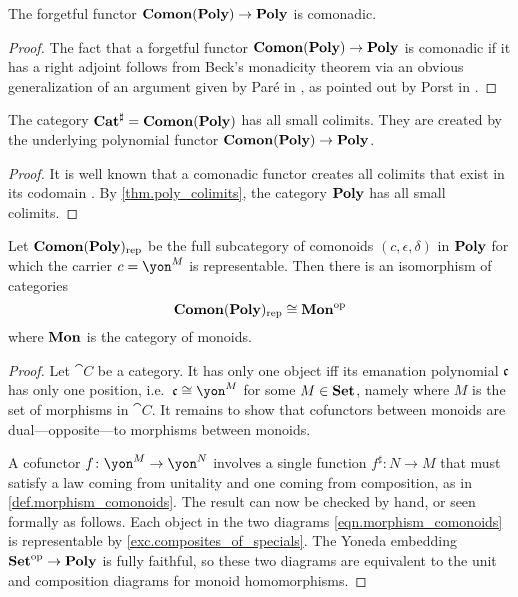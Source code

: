 \documentclass[Book-Poly]{subfiles}
\begin{document}
\begin{proposition}[Porst]
The forgetful functor $\mathbf{Comon}(\mathbf{Poly}) \to \mathbf{Poly}$ is comonadic.
\end{proposition}
\begin{proof}
The fact that a forgetful functor $\mathbf{Comon}(\mathbf{Poly}) \to \mathbf{Poly}$ is comonadic if it has a right adjoint follows from Beck's monadicity theorem via an obvious generalization of an argument given by Par{\'e} in \cite[pp.~138-9]{pare1969absolute}, as pointed out by Porst in \cite[Fact~3.1]{porst2019colimits}.
\end{proof}

\begin{corollary}
The category $\mathbf{Cat}^\sharp = \mathbf{Comon}(\mathbf{Poly})$ has all small colimits.
They are created by the underlying polynomial functor $\mathbf{Comon}(\mathbf{Poly}) \to \mathbf{Poly}$.
\end{corollary}
\begin{proof}
It is well known that a comonadic functor creates all colimits that exist in its codomain \cite{nlab:created-limit}.
By \cref{thm.poly_colimits}, the category $\mathbf{Poly}$ has all small colimits.
\end{proof}

\begin{proposition}
Let $\mathbf{Comon}(\mathbf{Poly})_{\text{rep}}$ be the full subcategory of comonoids $(c,\epsilon,\delta)$ in $\mathbf{Poly}$ for which the carrier $c=\yon^M$ is representable. Then there is an isomorphism of categories
\[
\mathbf{Comon}(\mathbf{Poly})_{\text{rep}}\cong\mathbf{Mon}^{\textnormal{op}}
\]
where $\mathbf{Mon}$ is the category of monoids.
\end{proposition}
\begin{proof}
Let $\cat{C}$ be a category. It has only one object iff its emanation polynomial $\mathfrak{c}$ has only one position, i.e.\ $\ema{c}\cong\yon^M$ for some $M\in\mathbf{Set}$, namely where $M$ is the set of morphisms in $\cat{C}$. It remains to show that cofunctors between monoids are dual---opposite---to morphisms between monoids.

A cofunctor $f\colon\yon^M\to\yon^N$ involves a single function $f^\sharp\colon N\to M$ that must satisfy a law coming from unitality and one coming from composition, as in \cref{def.morphism_comonoids}. The result can now be checked by hand, or seen formally as follows. Each object in the two diagrams \eqref{eqn.morphism_comonoids} is representable by \cref{exc.composites_of_specials}. The Yoneda embedding $\mathbf{Set}^{\textnormal{op}}\to\mathbf{Poly}$ is fully faithful, so these two diagrams are equivalent to the unit and composition diagrams for monoid homomorphisms.
\end{proof}
\end{document}
